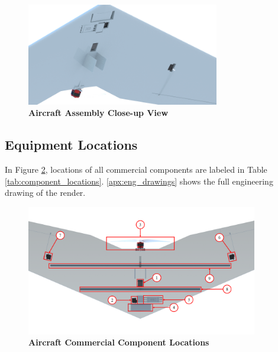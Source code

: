         \begin{figure}[H]
            \centering
            \includegraphics[width=0.75\textwidth]{homeworks/homework4/report/Figure/aircraft_assembly_3.png}
            \caption{\textbf{Aircraft Assembly Close-up View}}
            \label{fig:closeup_render}
        \end{figure}
    
    \subsection{Equipment Locations}
    
        In Figure \ref{fig:component_locations}, locations of all commercial components are labeled in Table \ref{tab:component_locations}. \ref{apx:eng_drawings} shows the full engineering drawing of the render.
        
        \begin{figure}[H]
            \centering
            \includegraphics[width=0.9\textwidth]{homeworks/homework4/report/Figure/aircraft_assembly_underbelly_labeled.png}
            \caption{\textbf{Aircraft Commercial Component Locations}}
            \label{fig:component_locations}
        \end{figure}
        
